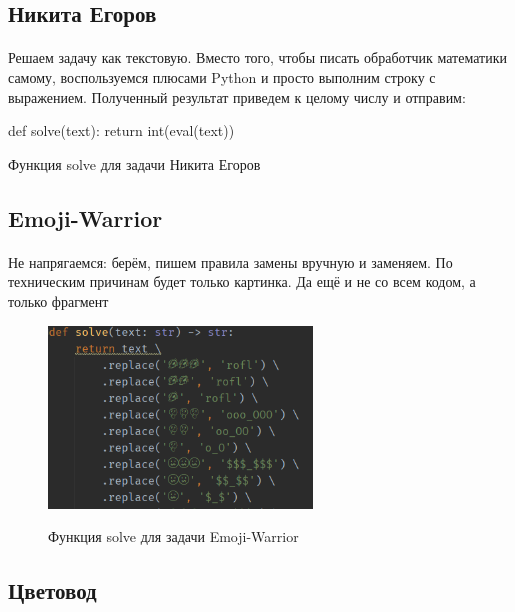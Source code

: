 \documentclass[12pt]{article}
\begin{document}
    \subsection{Никита Егоров}
    \paragraph{}
    Решаем задачу как текстовую.
    Вместо того, чтобы писать обработчик математики самому, воспользуемся плюсами Python и просто выполним
    строку с выражением.
    Полученный результат приведем к целому числу и отправим:
    \begin{listing}[H]
        \begin{pythoncode}
def solve(text):
    return int(eval(text))
        \end{pythoncode}
        \label{lst:solve6}
        \caption{Функция solve для задачи Никита Егоров}
    \end{listing}

    \subsection{Emoji-Warrior}
    \paragraph{}
    Не напрягаемся: берём, пишем правила замены вручную и заменяем.
    По техническим причинам будет только картинка. Да ещё и не со всем кодом, а только фрагмент
    \begin{figure}[H]
        \centering
        \includegraphics[width=7cm]{task6}
        \label{fig:solve6}
        \caption{Функция solve для задачи Emoji-Warrior}
    \end{figure}

    \subsection{Цветовод}
\end{document}
